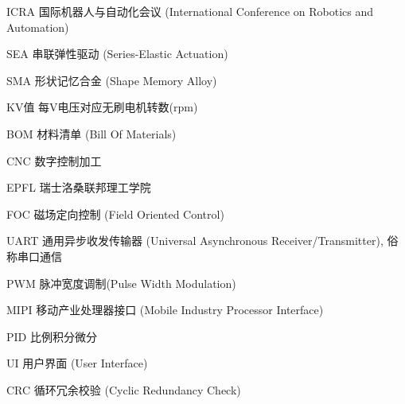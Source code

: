 
\begin{denotation}[3cm]
\item[ICRA] 国际机器人与自动化会议 (International Conference on Robotics and Automation)
\item[SEA] 串联弹性驱动 (Series-Elastic Actuation)
\item[SMA] 形状记忆合金 (Shape Memory Alloy)
\item[KV值] 每V电压对应无刷电机转数(rpm)
\item[BOM] 材料清单 (Bill Of Materials) 
\item[CNC] 数字控制加工
\item[EPFL] 瑞士洛桑联邦理工学院 
\item[FOC] 磁场定向控制 (Field Oriented Control)
\item[UART] 通用异步收发传输器 (Universal Asynchronous Receiver/Transmitter), 俗称串口通信
\item[PWM] 脉冲宽度调制(Pulse Width Modulation)
\item[MIPI] 移动产业处理器接口 (Mobile Industry Processor Interface) 
\item[PID] 比例积分微分
\item[UI] 用户界面 (User Interface) 
\item[CRC] 循环冗余校验 (Cyclic Redundancy Check) 
\end{denotation}
 

